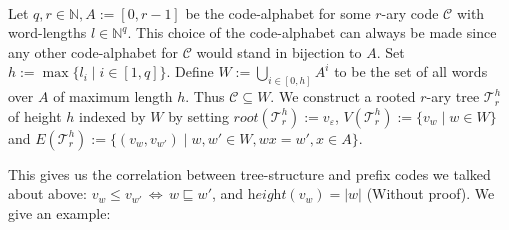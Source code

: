 \documentclass[12pt]{article}
\newcommand{\T}[0]{{\mathcal{T}_r^h}}
\newcommand{\he}[0]{\textit{height}}
\newcommand{\ro}[0]{\textit{root}}
\newenvironment{statement3}[3]{\begin{trivlist}
\item[\hskip \labelsep {\bfseries #1}\hskip \labelsep {\bfseries #2} {#3}\textbf{.}]}{\end{trivlist}}
\begin{document}
\begin{statement3}{(1.4)}{Definition}{(r-ary Trees from r-ary Codes)}\strut\\[2pt]
    Let $q,r \in \mathbb{N}, A := [0,r-1]$ be the code-alphabet for some $r$-ary code $\mathcal{C}$ with word-lengths
    $l \in \mathbb{N}^q$. This choice of the code-alphabet can always be made since any other code-alphabet
    for $\mathcal{C}$ would stand in bijection to $A$.
    Set $h := \max\{l_i \mid i \in [1,q]\}$.
    Define $W := \bigcup_{i \in [0,h]} A^i$ to be the set of all words over $A$ of maximum length $h$. Thus
    $\mathcal{C} \subseteq W$. We construct a rooted $r$-ary tree $\T$ of height $h$ indexed by $W$ by setting
    $\ro(\T) := v_\varepsilon$, $V(\T) := \{v_w \mid w \in W\}$ and
    $E(\T) := \{(v_w,v_{w'}) \mid w,w' \in W, wx = w', x\in A\}$.
\end{statement3}
This gives us the correlation between tree-structure and prefix codes we talked about above:
$v_w \leq v_{w'} \,\Longleftrightarrow\, w \sqsubseteq w'$, and $\he(v_w) = |w|$ (Without
proof).
We give an example:
\end{document}

